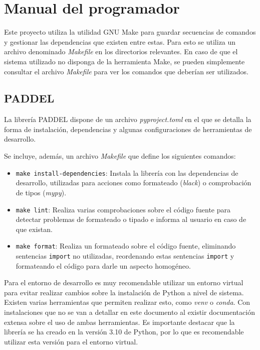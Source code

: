 \section{Manual del programador}

Este proyecto utiliza la utilidad GNU Make para guardar secuencias de comandos y
gestionar las dependencias que existen entre estas. Para esto se utiliza un
archivo denominado \textit{Makefile} en los directorios relevantes. En caso de
que el sistema utilizado no disponga de la herramienta Make, se pueden
simplemente consultar el archivo \textit{Makefile} para ver los comandos que
deberían ser utilizados.


\subsection{PADDEL}

La librería PADDEL dispone de un archivo \textit{pyproject.toml} en el que se
detalla la forma de instalación, dependencias y algunas configuraciones de
herramientas de desarrollo.

Se incluye, además, un archivo \textit{Makefile} que define los siguientes
comandos:

\begin{itemize}
      \item \texttt{make install-dependencies}: Instala la librería con las
            dependencias de desarrollo, utilizadas para acciones como formateado
            (\textit{black}) o comprobación de tipos (\textit{mypy}).
      \item \texttt{make lint}: Realiza varias comprobaciones sobre el código
            fuente para detectar problemas de formateado o tipado e informa al
            usuario en caso de que existan.
      \item \texttt{make format}: Realiza un formateado sobre el código fuente,
            eliminando sentencias \texttt{import} no utilizadas, reordenando estas
            sentencias \texttt{import} y formateando el código para darle un
            aspecto homogéneo.
\end{itemize}

Para el entorno de desarrollo es muy recomendable utilizar un entorno virtual
para evitar realizar cambios sobre la instalación de Python a nivel de sistema.
Existen varias herramientas que permiten realizar esto, como \textit{venv} o
\textit{conda}. Con instalaciones que no se van a detallar en este documento al
existir documentación extensa sobre el uso de ambas herramientas. Es importante
destacar que la librería se ha creado en la versión 3.10 de Python, por lo que
es recomendable utilizar esta versión para el entorno virtual.

